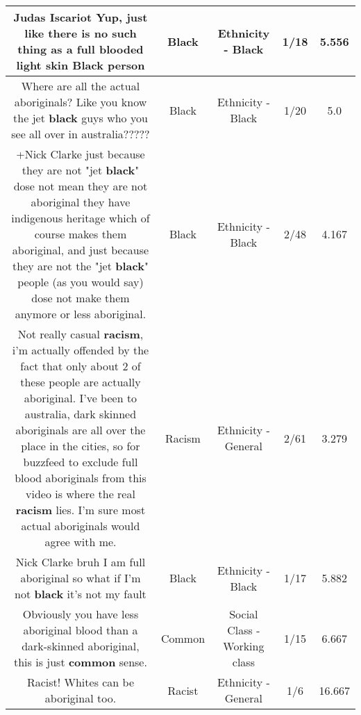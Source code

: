 \documentclass[11pt]{article}
\newlength\mylength
\begin{document}
\begin{center}
\begin{longtable}{|C{.65\mylength}|C{.30\mylength}|C{.12\mylength}|C{.12\mylength}|C{.12\mylength}|}
  \small Judas Iscariot Yup, just like there is no such thing as a full blooded light skin \textbf{Black} person\normalsize   & Black & Ethnicity - Black & 1/18 & 5.556 \\  \hline
  \small Where are all the actual aboriginals? Like you know the jet \textbf{black} guys who you see all over in australia?????\normalsize   & Black & Ethnicity - Black & 1/20 & 5.0 \\  \hline
  \small +Nick Clarke just because they are not "jet \textbf{black}" dose not mean they are not aboriginal they have indigenous heritage which of course makes them aboriginal, and just because they are not the "jet \textbf{black}" people (as you would say) dose not make them anymore or less aboriginal.\normalsize   & Black & Ethnicity - Black & 2/48 & 4.167 \\  \hline
  \small Not really casual \textbf{racism}, i'm actually offended by the fact that only about 2 of these people are actually aboriginal. I've been to australia, dark skinned aboriginals are all over the place in the cities, so for buzzfeed to exclude full blood aboriginals from this video is where the real \textbf{racism} lies. I'm sure most actual aboriginals would agree with me.\normalsize   & Racism & Ethnicity - General & 2/61 & 3.279 \\  \hline
  \small Nick Clarke bruh I am full aboriginal so what if I'm not \textbf{black} it's not my fault\normalsize   & Black & Ethnicity - Black & 1/17 & 5.882 \\  \hline
  \small Obviously you have less aboriginal blood than a dark-skinned aboriginal, this is just \textbf{common} sense.\normalsize   & Common & Social Class - Working class & 1/15 & 6.667 \\  \hline
  \small Racist! Whites can be aboriginal too.\normalsize   & Racist & Ethnicity - General & 1/6 & 16.667 \\  \hline

\end{longtable}
\end{center}
\end{document}
